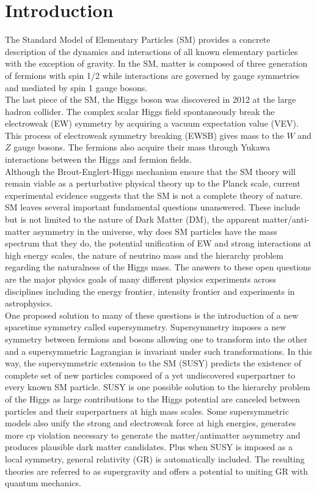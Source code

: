 \chapter{Introduction}
\label{introduction}

\indent The Standard Model of Elementary Particles (SM) provides a concrete description of the dynamics and interactions of all known elementary particles with the exception of gravity.  In the SM, matter is composed of three generation of fermions with spin 1/2 while interactions are governed by gauge symmetries and mediated by spin 1 gauge bosons.  \\

\indent The last piece of the SM, the Higgs boson was discovered in 2012 at the large hadron collider.  The complex scalar Higgs field spontaneously break the electroweak (EW) symmetry by acquiring a vacuum expectation value (VEV). This process of electroweak symmetry breaking (EWSB) gives mass to the $W$ and $Z$ gauge bosons. The fermions also acquire their mass through Yukawa interactions between the Higgs and fermion fields. \\

\indent Although the Brout-Englert-Higgs mechanism ensure that the SM theory will remain viable as a perturbative physical theory up to the Planck scale, current experimental evidence suggests that the SM is not a complete theory of nature.  SM leaves several important fundamental questions unanswered.  These include but is not limited to the nature of Dark Matter (DM), the apparent matter/anti-matter asymmetry in the universe,  why does SM particles have the mass spectrum that they do, the potential unification of EW and strong interactions at high energy scales, the nature of neutrino mass and the hierarchy problem regarding the naturalness of the Higgs mass.  The answers to these open questions are the major physics goals of many different physics experiments across disciplines including the energy frontier, intensity frontier and experiments in astrophysics. \\

\indent One proposed solution to many of these questions is the introduction of a new spacetime symmetry called supersymmetry.  Supersymmetry imposes a new symmetry between fermions and bosons allowing one to transform into the other and a supersymmetric Lagrangian is invariant under such transformations.  In this way, the supersymmetric extension to the SM (SUSY) predicts the existence of complete set of new particles composed of a yet undiscovered superpartner to every known SM particle.  SUSY is one possible solution to the hierarchy problem of the Higgs as large contributions to the Higgs potential are canceled between particles and their superpartners at high mass scales.  Some supersymmetric models also unify the strong and electroweak force at high energies, generates more cp violation necessary to generate the matter/antimatter asymmetry and produces plausible dark matter candidates.  Plus when SUSY is imposed as a local symmetry, general relativity (GR) is automatically included.  The resulting theories are referred to as supergravity and offers a potential to uniting GR with quantum mechanics.  \\

